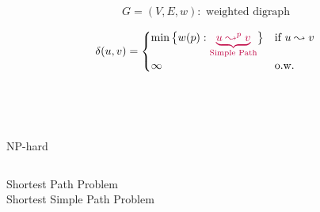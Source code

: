 \begin{frame}{}
  \begin{definition}
    \[
      G = (V, E, w): \text{ weighted digraph}
    \]

    \[
      \delta(u,v) = \begin{cases}
	\min \big\{ w(p): \textcolor{purple}{\underbrace{u \leadsto^{p} v}_{\text{Simple Path}}} \big\} & \text{if } u \leadsto v \\
	\infty	& \text{o.w.}
      \end{cases}
    \]
  \end{definition}

  \pause
  \vspace{0.60cm}
  \begin{center}
     \\[15pt] \pause

     \\[15pt] \pause

    \textsf{NP}-hard
  \end{center}
\end{frame}

\begin{frame}{}
  \begin{columns}[b]
      \begin{center}
	Shortest Path Problem \\[30pt]

	Shortest Simple Path Problem
      \end{center}
  \end{columns}
\end{frame}
